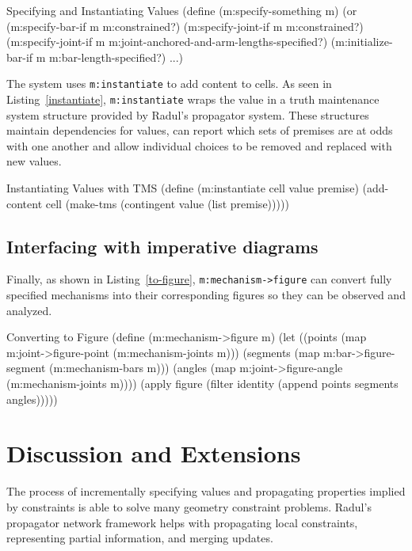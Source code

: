 \begin{code-listing}
[label=specify-something]
{Specifying and Instantiating Values}
(define (m:specify-something m)
  (or
   (m:specify-bar-if m m:constrained?)
   (m:specify-joint-if m m:constrained?)
   (m:specify-joint-if m m:joint-anchored-and-arm-lengths-specified?)
   (m:initialize-bar-if m m:bar-length-specified?)
   ...)
\end{code-listing}

The system uses \texttt{m:instantiate} to add content to cells. As
seen in Listing~\ref{instantiate}, \texttt{m:instantiate} wraps
the value in a truth maintenance system structure provided by Radul's
propagator system. These structures maintain dependencies for values, can report
which sets of premises are at odds with one another and allow
individual choices to be removed and replaced with new values.
\enlargethispage*{\baselineskip}

\begin{code-listing}
[label=instantiate]
{Instantiating Values with TMS}
(define (m:instantiate cell value premise)
  (add-content cell (make-tms (contingent value (list premise)))))
\end{code-listing}

\subsection{Interfacing with imperative diagrams}

Finally, as shown in Listing~\ref{to-figure},
\texttt{m:mechanism->figure} can convert fully specified mechanisms
into their corresponding figures so they can be observed and analyzed.

\begin{code-listing}
[label=to-figure]
{Converting to Figure}
(define (m:mechanism->figure m)
  (let ((points (map m:joint->figure-point (m:mechanism-joints m)))
        (segments (map m:bar->figure-segment (m:mechanism-bars m)))
        (angles (map m:joint->figure-angle (m:mechanism-joints m))))
    (apply figure (filter identity (append points segments angles)))))
\end{code-listing}

\section{Discussion and Extensions}

The process of incrementally specifying values and propagating
properties implied by constraints is able to solve many geometry
constraint problems. Radul's propagator network framework helps with
propagating local constraints, representing partial information, and
merging updates.

